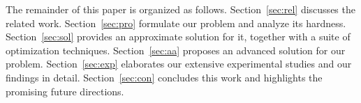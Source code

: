 %




%
%

%
%
The remainder of this paper is organized as follows.
Section~\ref{sec:rel} discusses the related work.
Section~\ref{sec:pro} formulate our problem and analyze its hardness.
Section~\ref{sec:sol} provides an approximate solution for it, together with a suite of optimization techniques.
Section~\ref{sec:aa} proposes an advanced solution for our problem.
Section~\ref{sec:exp} elaborates our extensive experimental studies and our findings in detail.
Section~\ref{sec:con} concludes this work and highlights the promising future directions.
